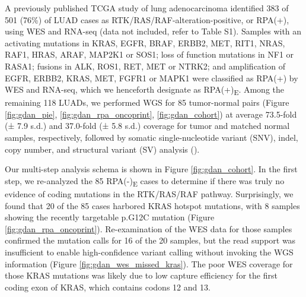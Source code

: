 \documentclass[phd,tocprelim]{cornell}
\begin{document}
A previously published TCGA study of lung adenocarcinoma \cite{Campbell2016-xv} identified 383 of 501 (76\%) of LUAD cases as RTK/RAS/RAF-alteration-positive, or RPA(+), using WES and RNA-seq (data not included, refer to \cite{Carrot-Zhang2020-vl} Table S1). Samples with an activating mutations in KRAS, EGFR, BRAF, ERBB2, MET, RIT1, NRAS, RAF1, HRAS, ARAF, MAP2K1 or SOS1; loss of function mutations in NF1 or RASA1; fusions in ALK, ROS1, RET, MET or NTRK2; and amplification of EGFR, ERBB2, KRAS, MET, FGFR1 or MAPK1 were classified as RPA(+) by WES and RNA-seq, which we henceforth designate as RPA(+)\textsubscript{E}. Among the remaining 118 LUADs, we performed WGS for 85 tumor-normal pairs (Figure \ref{fig:gdan_pie}, \ref{fig:gdan_rpa_oncoprint}, \ref{fig:gdan_cohort}) at average 73.5-fold (± 7.9 s.d.) and 37.0-fold (± 5.8 s.d.) coverage for tumor and matched normal samples, respectively, followed by somatic single-nucleotide variant (SNV), indel, copy number, and structural variant (SV) analysis ().

Our multi-step analysis schema is shown in Figure \ref{fig:gdan_cohort}. In the first step, we re-analyzed the 85 RPA(-)\textsubscript{E} cases to determine if there was truly no evidence of coding mutations in the RTK/RAS/RAF pathway. Surprisingly, we found that 20 of the 85 cases harbored KRAS hotspot mutations, with 8 samples showing the recently targetable p.G12C mutation \cite{Canon2019-aj,Ostrem2013-lt} (Figure \ref{fig:gdan_rpa_oncoprint}). Re-examination of the WES data for those samples confirmed the mutation calls for 16 of the 20 samples, but the read support was insufficient to enable high-confidence variant calling without invoking the WGS information (Figure \ref{fig:gdan_wes_missed_kras}). The poor WES coverage for those KRAS mutations was likely due to low capture efficiency \cite{Clark2011-iq} for the first coding exon of KRAS, which contains codons 12 and 13. 
\end{document}
